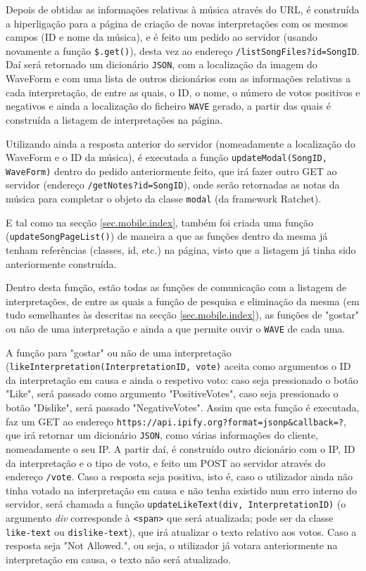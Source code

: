 \documentclass[a4paper,11pt,openright,oneside]{report}
\begin{document}
Depois de obtidas as informações relativas à música através do URL, é construída a hiperligação para a página de criação de novas interpretações com os mesmos campos (ID e nome da música), e é feito um pedido ao servidor (usando novamente a função \texttt{\$.get()}), desta vez ao endereço \texttt{/listSongFiles?id=SongID}. Daí será retornado um dicionário \verb|JSON|, com a localização da imagem do WaveForm e com uma lista de outros dicionários com as informações relativas a cada interpretação, de entre as quais, o ID, o nome, o número de votos positivos e negativos e ainda a localização do ficheiro \verb|WAVE| gerado, a partir das quais é construída a listagem de interpretações na página.

Utilizando ainda a resposta anterior do servidor (nomeadamente a localização do WaveForm e o ID da música), é executada a função \texttt{updateModal(SongID, WaveForm)} dentro do pedido anteriormente feito, que irá fazer outro GET ao servidor (endereço \texttt{/getNotes?id=SongID}), onde serão retornadas as notas da música para completar o objeto da classe \texttt{modal} (da framework Ratchet).

E tal como na secção \autoref{sec.mobile.index}, também foi criada uma função (\texttt{updateSongPageList()}) de maneira a que as funções dentro da mesma já tenham referências (classes, id, etc.) na página, visto que a listagem já tinha sido anteriormente construída.

Dentro desta função, estão todas as funções de comunicação com a listagem de interpretações, de entre as quais a função de pesquisa e eliminação da mesma (em tudo semelhantes às descritas na secção \autoref{sec.mobile.index}), as funções de "gostar" ou não de uma interpretação e ainda a que permite ouvir o \verb|WAVE| de cada uma.

A função para "gostar" ou não de uma interpretação (\texttt{likeInterpretation}\texttt{(InterpretationID, vote)} aceita como argumentos o ID da interpretação em causa e ainda o respetivo voto: caso seja pressionado o botão "Like", será passado como argumento "PositiveVotes", caso seja pressionado o botão "Dislike", será passado "NegativeVotes". Assim que esta função é executada, faz um GET ao endereço \texttt{https://api.ipify.org?format=jsonp\&callback=?}, que irá retornar um dicionário \verb|JSON|, como várias informações do cliente, nomeadamente o seu IP. A partir daí, é construído outro dicionário com o IP, ID da interpretação e o tipo de voto, e feito um POST ao servidor através do endereço \texttt{/vote}. Caso a resposta seja positiva, isto é, caso o utilizador ainda não tinha votado na interpretação em causa e não tenha existido num erro interno do servidor, será chamada a função \texttt{updateLikeText(div, InterpretationID)} (o argumento \textit{div} corresponde à \texttt{<span>} que será atualizada; pode ser da classe \texttt{like-text} ou \texttt{dislike-text}), que irá atualizar o texto relativo aos votos. Caso a resposta seja "Not Allowed.", ou seja, o utilizador já votara anteriormente na interpretação em causa, o texto não será atualizado.
\end{document}
